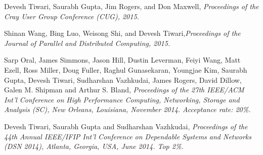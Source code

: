 {\textnormal{\newline Devesh Tiwari, Saurabh Gupta, Jim Rogers, and Don Maxwell,}} {\textit{Proceedings of the Cray User Group Conference (CUG), 2015.\newline}}{}{}{} %

{\textnormal{\newline Shinan Wang, Bing Luo, Weisong Shi, and Devesh Tiwari,}}{\textit{Proceedings of the Journal of Parallel and Distributed Computing, 2015.\newline}}{}{}{} %



{\textnormal{\newline Sarp Oral, James Simmons, Jason Hill, Dustin Leverman, Feiyi Wang, Matt Ezell, Ross Miller, Doug Fuller, Raghul Gunasekaran, Youngjae Kim, Saurabh Gupta, Devesh Tiwari, Sudharshan Vazhkudai, James Rogers, David Dillow, Galen M. Shipman and Arthur S. Bland,}} {\textit{Proceedings of the 27th IEEE/ACM Int'l Conference on High Performance Computing, Networking, Storage and Analysis (SC), New Orleans, Louisiana, November 2014. Acceptance rate: 20\%.\newline}}{}{}{} %
				
{\textnormal{\newline Devesh Tiwari, Saurabh Gupta and Sudharshan Vazhkudai,}} {\textit{Proceedings of the 44th Annual IEEE/IFIP Int’l Conference on Dependable Systems and Networks (DSN 2014), Atlanta, Georgia, USA, June 2014. Top 2\%.\newline}}{}{}{} %

